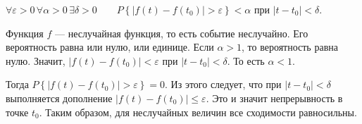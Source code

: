 $ \forall \varepsilon > 0 \, \forall \alpha > 0 \, \exists \delta > 0 \qquad
  P \left\{ \left| f \left( t \right) - f \left( t_0 \right) \right| > \varepsilon \right\} <
  \alpha $
при $ \left| t - t_0 \right| < \delta $.

Функция $f$ --- неслучайная функция, то есть событие неслучайно.
Его вероятность равна или нулю, или единице.
Если $ \alpha > 1$, то вероятность равна нулю.
Значит, $ \left| f \left( t \right) - f \left( t_0 \right) \right| < \varepsilon $ при
$ \left| t - t_0 \right| <
  \delta $.
То есть $ \alpha < 1$.

Тогда
$P \left\{ \left| f \left( t \right) - f \left( t_0 \right) \right| > \varepsilon \right\} =
  0$.
Из этого следует, что при $ \left| t - t_0 \right| < \delta $ выполняется дополнение
$ \left| f \left( t \right) - f \left( t_0 \right) \right| \leq
  \varepsilon $.
Это и значит непрерывность в точке $t_0$.
Таким образом, для неслучайных величин все сходимости равносильны.
